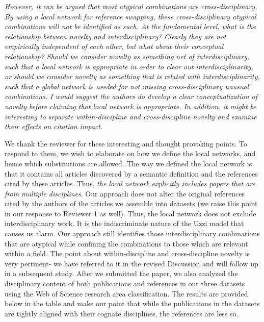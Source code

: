 \documentclass[11pt, oneside]{article}   	%
\begin{document}
\emph{However, it can be argued that most atypical combinations are cross-disciplinary.  By using a local network for reference swapping, these cross-disciplinary atypical combinations will not be identified as such.  At the fundamental level, what is the relationship between novelty and interdisciplinary?  Clearly they are not empirically independent of each other, but what about their conceptual relationship?  Should we consider novelty as something net of interdisciplinary, such that a local network is appropriate in order to clear out interdisciplinarity, or should we consider novelty as something that is related with interdisciplinarity, such that a global network is needed for not missing cross-disciplinary unusual combinations.  I would suggest the authors do develop a clear conceptualization of novelty before claiming that local network is appropriate.  In addition, it might be interesting to separate within-discipline and cross-discipline novelty and examine their effects on citation impact.}

We thank the reviewer for these interesting and thought provoking points. To respond to them, we  wish to elaborate on how we define the local networks, and hence which substitutions are allowed. The way we defined the local network is that it contains all articles discovered by a semantic definition and the references cited by these articles. Thus, \emph{the local network explicitly includes papers that are from multiple disciplines}. Our approach does not alter the original references cited by the authors of the articles we assemble into datasets (we raise this point in our response to Reviewer 1 as well). Thus, the local network does not exclude interdisciplinary work. It is the indiscriminate nature of the Uzzi model that causes us alarm.  Our approach still identifies those interdisciplinary combinations that are atypical while confining the combinations to those which are relevant within a field.  The point about within-discipline and cross-discipline novelty is very pertinent- we have referred to it in the revised Discussion and will follow up in a subsequent study. After we submitted the paper, we also analyzed the disciplinary content of both publications and references in our three datasets using the Web of Science research area classification. The results are provided below in the table and make our point that while the publications in the datasets are tightly aligned with their cognate disciplines, the references are less so. \newpage
\end{document}
